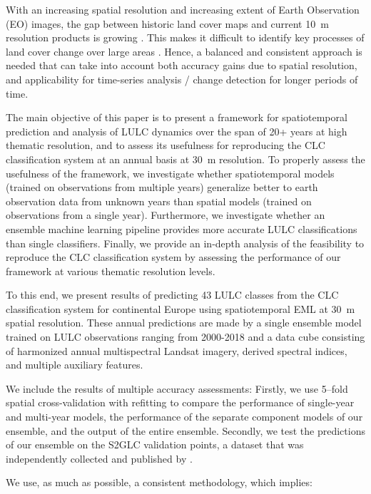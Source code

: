 With an increasing spatial resolution and increasing extent of Earth Observation (EO) images, the gap between historic land cover maps and current 10~m resolution products is growing \citep{van2019does,dandrimont2021lucas}. This makes it difficult to identify key processes of land cover change over large areas \citep{veldkamp2001predicting,vilar2019comparative}. Hence, a balanced and consistent approach is needed that can take into account both accuracy gains due to spatial resolution, and applicability for time-series analysis / change detection for longer periods of time.

The main objective of this paper is to present a framework for spatiotemporal prediction and analysis of LULC dynamics over the span of 20+ years at high thematic resolution, and to assess its usefulness for reproducing the CLC classification system at an annual basis at 30~m resolution. 
To properly assess the usefulness of the framework, we investigate whether spatiotemporal models (trained on observations from multiple years) generalize better to earth observation data from unknown years than spatial models (trained on observations from a single year). Furthermore, we investigate whether an ensemble machine learning pipeline provides more accurate LULC classifications than single classifiers. Finally, we provide an in-depth analysis of the feasibility to reproduce the CLC classification system by assessing the performance of our framework at various thematic resolution levels.

To this end, we present results of predicting 43 LULC classes from the CLC classification system for continental Europe using spatiotemporal EML at 30~m spatial resolution. These annual predictions are made by a single ensemble model trained on LULC observations ranging from 2000-2018 and a data cube consisting of harmonized annual multispectral Landsat imagery, derived spectral indices, and multiple auxiliary features. 

We include the results of multiple accuracy assessments: Firstly, we use 5--fold spatial cross-validation with refitting \citep{roberts2017cross,lovelace2019geocomputation} to compare the performance of single-year and multi-year models, the performance of the separate component models of our ensemble, and the output of the entire ensemble. Secondly, we test the predictions of our ensemble on the S2GLC validation points, a dataset that was independently collected and published by \citet{malinowski2020}. 

We use, as much as possible, a consistent methodology, which implies:

